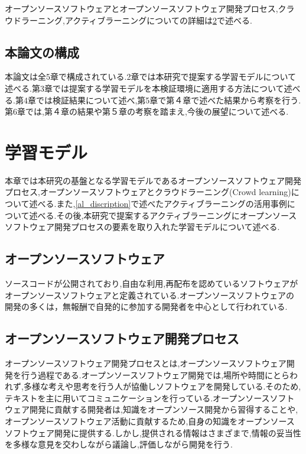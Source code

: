 \documentclass[11pt, a4paper]{jreport}
\begin{document}
オープンソースソフトウェアとオープンソースソフトウェア開発プロセス,クラウドラーニング,アクティブラーニングについての詳細は\ref{gakusyuumodel}で述べる.

\section{本論文の構成}

本論文は全5章で構成されている.2章では本研究で提案する学習モデルについて述べる.第3章では提案する学習モデルを本検証環境に適用する方法について述べる.第4章では検証結果について述べ,第5章で第４章で述べた結果から考察を行う.第6章では,第４章の結果や第５章の考察を踏まえ,今後の展望について述べる.

\chapter{学習モデル}\label{gakusyuumodel}

本章では本研究の基盤となる学習モデルであるオープンソースソフトウェア開発プロセス,オープンソースソフトウェアとクラウドラーニング(Crowd learning)について述べる.また,\ref{al_discription}で述べたアクティブラーニングの活用事例について述べる.その後,本研究で提案するアクティブラーニングにオープンソースソフトウェア開発プロセスの要素を取り入れた学習モデルについて述べる.

\section{オープンソースソフトウェア}\label{oss_discription}

ソースコードが公開されており,自由な利用,再配布を認めているソフトウェアがオープンソースソフトウェアと定義されている\cite{bib:oss_definition}.オープンソースソフトウェアの開発の多くは，無報酬で自発的に参加する開発者を中心として行われている.

\section{オープンソースソフトウェア開発プロセス}\label{osspr_discription}

オープンソースソフトウェア開発プロセスとは,オープンソースソフトウェア開発を行う過程である.オープンソースソフトウェア開発では,場所や時間にとらわれず,多様な考えや思考を行う人が協働しソフトウェアを開発している.そのため,テキストを主に用いてコミュニケーションを行っている.オープンソースソフトウェア開発に貢献する開発者は,知識をオープンソース開発から習得することや, オープンソースソフトウェア活動に貢献するため,自身の知識をオープンソースソフトウェア開発に提供する.しかし,提供される情報はさまざまで,情報の妥当性を多様な意見を交わしながら議論し,評価しながら開発を行う.
\end{document}

